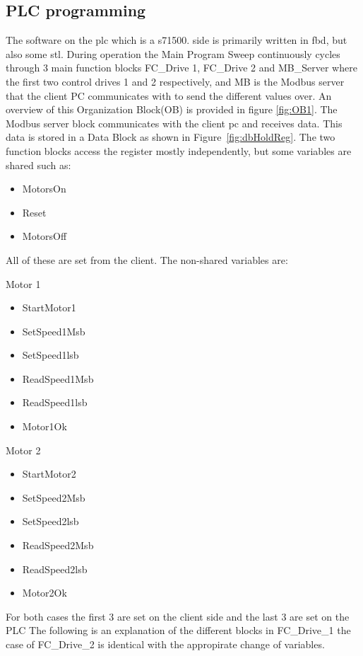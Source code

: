 \documentclass{ol-softwaremanual}
\newcommand{\figref}[1]{Figure~\ref{#1}}
\begin{document}
\subsection{PLC programming}
The software on the \acrshort{plc} which is a  \Gls{s71500}. side is primarily written in \acrshort{fbd}, but also some \acrshort{stl}. During operation the Main Program Sweep continuously cycles through 3 main function blocks FC\_Drive 1, FC\_Drive 2 and MB\_Server where the first two control drives 1 and 2 respectively, and MB is the Modbus server that the client PC communicates with to send the different values over. An overview of this Organization Block(OB) is provided in figure \ref{fig:OB1}. The Modbus server block communicates with the client pc and receives data. This data is stored in a Data Block as shown in \figref{fig:dbHoldReg}. The two function blocks access the register mostly independently, but some variables are shared such as:
\begin{itemize}
    \item MotorsOn
    \item Reset
    \item MotorsOff
\end{itemize}
All of these are set from the client. 
The non-shared variables are:
\begin{multicols}{2}
Motor 1
\begin{itemize}
    \item StartMotor1
    \item SetSpeed1Msb
    \item SetSpeed1lsb
    \item ReadSpeed1Msb
    \item ReadSpeed1lsb
    \item Motor1Ok
\end{itemize}
Motor 2 
\begin{itemize}
    \item StartMotor2
    \item SetSpeed2Msb
    \item SetSpeed2lsb
    \item ReadSpeed2Msb
    \item ReadSpeed2lsb
    \item Motor2Ok
\end{itemize}
\end{multicols}
For both cases the first 3 are set on the client side and the last 3 are set on the PLC
The following is an explanation of the different blocks in FC\_Drive\_1 the case of FC\_Drive\_2 is identical with the appropirate change of variables. 
\end{document}
